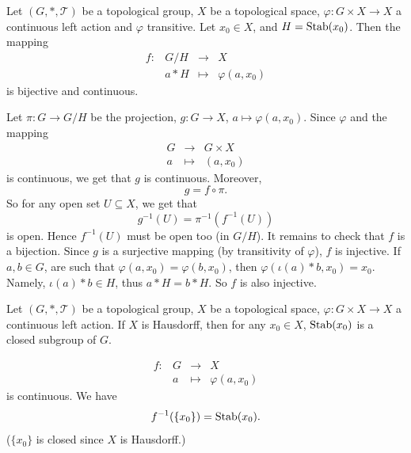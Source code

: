\begin{propositionenv}\label{prop:5.2.17}
    Let $(G,*,\mathscr{T})$ be a topological group,
    $X$ be a topological space,
    $\varphi : G \times X \rightarrow X$ a continuous left action and $\varphi$ transitive.
    Let $x_0 \in X$, and $H =\operatorname{\mathrm{Stab}} (x_0)$.
    Then the mapping
    $$\begin{array}{rrcl}
        f : & G/H & \longrightarrow & X\\
        & a * H & \longmapsto & \varphi (a,x_0)
    \end{array}$$
    is bijective and continuous.
\end{propositionenv}
\begin{proofenv}
    Let $\pi : G \rightarrow G/H$ be the projection, $g: G\rightarrow X$, $a \mapsto \varphi (a,x_0)$.
    Since $\varphi$ and the mapping
    $$\begin{array}{rcl}
        G & \longrightarrow & G \times X\\
        a & \longmapsto & (a,x_0)
    \end{array}$$
    is continuous, we get that $g$ is continuous.
    Moreover,
    $$ g = f \circ \pi.$$
    So for any open set $U \subseteq X$, we get that
    $$ g^{-1} (U) = \pi^{-1} \left(f^{-1} (U)\right)$$
    is open.
    Hence $f^{-1}(U)$ must be open too (in $G/H$).
    It remains to check that $f$ is a bijection.
    Since $g$ is a surjective mapping (by transitivity of $\varphi$), $f$ is injective.
    If $a,b \in G$, are such that $\varphi (a,x_0) = \varphi (b,x_0)$, then $\varphi (\iota(a) * b, x_0) = x_0$.
    Namely, $\iota(a) * b \in H$, thus $a * H = b * H$.
    So $f$ is also injective.
\end{proofenv}

\begin{propositionenv}
    Let $(G,*,\mathscr{T})$ be a topological group,
    $X$ be a topological space,
    $\varphi : G \times X \rightarrow X$ a continuous left action.
    If $X$ is Hausdorff, then for any $x_0 \in X$, $\operatorname{\mathrm{Stab}}(x_0)$ is a closed subgroup of $G$.
\end{propositionenv}
\begin{proofenv}
    $$\begin{array}{rrcl}
        f : & G & \longrightarrow & X\\
        & a & \longmapsto & \varphi (a,x_0)
    \end{array}$$
    is continuous.
    We have 
    $$ f^{-1} (\{x_0\}) = \operatorname{\mathrm{Stab}}(x_0).$$
    ($\{x_0\}$ is closed since $X$ is Hausdorff.)
\end{proofenv}

